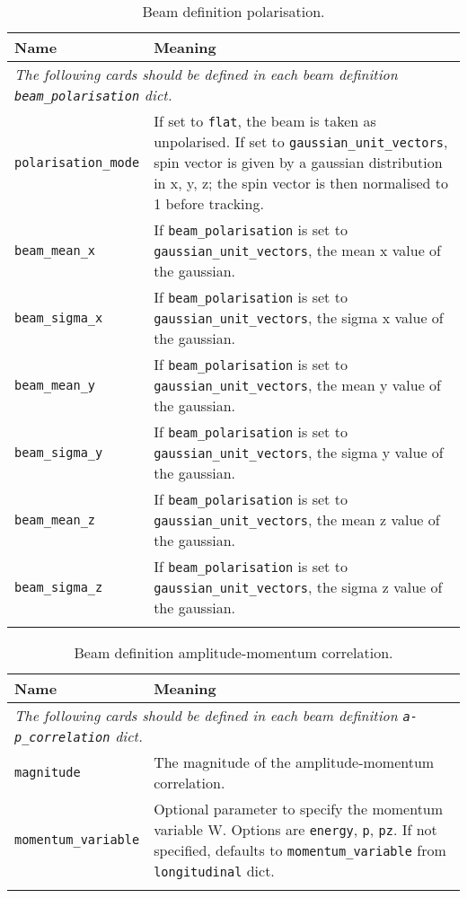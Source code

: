 \begin{table*}
\begin{center}
\caption{Beam definition polarisation.}
\begin{tabularx}{\linewidth}{lX}
Name & Meaning \\
\hline
\multicolumn{2}{l}{\emph{The following cards should be defined in each beam definition \verb|beam_polarisation| dict.}} \\
\hline
\verb|polarisation_mode| & If set to \verb|flat|, the beam is taken as unpolarised. If set to \verb|gaussian_unit_vectors|, spin vector is given by a gaussian distribution in x, y, z; the spin vector is then normalised to 1 before tracking. \\
\verb|beam_mean_x| & If \verb|beam_polarisation| is set to \verb|gaussian_unit_vectors|, the mean x value of the gaussian. \\
\verb|beam_sigma_x| & If \verb|beam_polarisation| is set to \verb|gaussian_unit_vectors|, the sigma x value of the gaussian. \\
\verb|beam_mean_y| & If \verb|beam_polarisation| is set to \verb|gaussian_unit_vectors|, the mean y value of the gaussian. \\
\verb|beam_sigma_y| & If \verb|beam_polarisation| is set to \verb|gaussian_unit_vectors|, the sigma y value of the gaussian. \\
\verb|beam_mean_z| & If \verb|beam_polarisation| is set to \verb|gaussian_unit_vectors|, the mean z value of the gaussian. \\
\verb|beam_sigma_z| & If \verb|beam_polarisation| is set to \verb|gaussian_unit_vectors|, the sigma z value of the gaussian. \\
\begin{makeimage} %
\end{makeimage}
\end{tabularx}
\end{center}
\end{table*}

\begin{table*}
\begin{center}
\caption{Beam definition amplitude-momentum correlation.}
\label{tab:apcorr}
\begin{tabularx}{\linewidth}{lX}
Name & Meaning \\
\hline
\multicolumn{2}{l}{\emph{The following cards should be defined in each beam definition \verb|a-p_correlation| dict.}} \\
\hline
\verb|magnitude| & The magnitude of the amplitude-momentum correlation. \\
\verb|momentum_variable| & Optional parameter to specify the momentum variable W. Options are \verb|energy|, \verb|p|, \verb|pz|. If not specified, defaults to \verb|momentum_variable| from \verb|longitudinal| dict.\\
\begin{makeimage} %
\end{makeimage}
\end{tabularx}
\end{center}
\end{table*}


